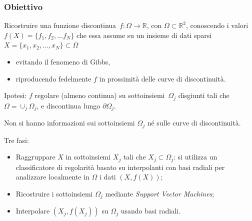 \documentclass[10pt]{beamer}
\theoremstyle{definition}
\theoremstyle{plain}
\def\R{\mathbb R}
\begin{document}
\begin{frame}
\frametitle{Obiettivo}
Ricostruire  una \alert{funzione discontinua}~$f:\Omega\to\R$, con $\Omega\subset\R^2$, conoscendo i valori $f(X) = \{f_1,f_2,\dots f_N\}$ che essa assume su un insieme di \alert{dati sparsi} $X=\{x_1,x_2,\dots,x_N\}\subset\Omega$

\begin{itemize}
\item evitando il fenomeno di Gibbs,
\item riproducendo fedelmente $f$ in prossimità delle curve di discontinuità.
\end{itemize}

\bigskip
\alert{Ipotesi}: $f$ regolare (almeno continua) su sottoinsiemi~$\Omega_j$ disgiunti tali che $\Omega = \cup_j \Omega_j$, e discontinua lungo $\partial \Omega_j$.

\medskip
Non si hanno informazioni sui sottoinsiemi $\Omega_j$ né sulle curve di discontinuità.



\end{frame}

\begin{frame}

Tre fasi:
\medskip
\begin{itemize}
\item Raggruppare  $X$ in sottoinsiemi $X_j$ tali che $X_j\subset \Omega_j$:
	 si utilizza un \alert{classificatore} di regolarità basato su interpolanti con basi radiali per analizzare localmente in $\Omega$ i dati $(X,f(X))$;

\medskip

\item Ricostruire i sottoinsiemi $\Omega_j$  mediante {\em Support Vector Machines};

\medskip

\item Interpolare $(X_j, f(X_j))$ su $\Omega_j$ usando basi radiali.
\end{itemize}
\end{frame}
\end{document}
